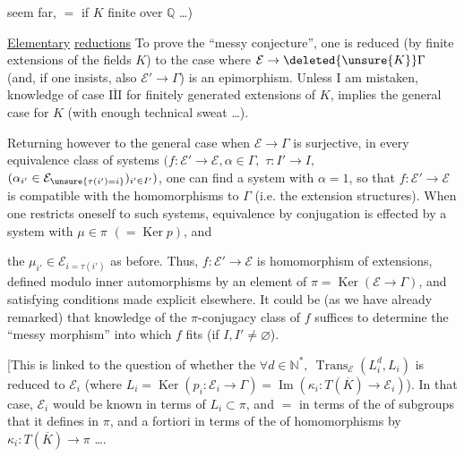 

seem far, $=$ if $K$ finite over $\mathbb Q$ \ldots)

\uline{Elementary} \uline{reductions} To prove the ``messy conjecture'', one is reduced (by finite extensions of the fields $K$) to the case where $\mathcal E\to\deleted{\unsure{K}}\Gamma$ (and, if one insists, also $\mathcal E'\to\Gamma$) is an epimorphism. Unless I am mistaken, knowledge of case \uline{$\overline{\mathrm{III}}$} for finitely generated extensions of $K$, implies the general case for $K$ (with enough technical sweat \ldots).

Returning however to the general case when $\mathcal E\to\Gamma$ is surjective, in every equivalence class of systems $(f:\mathcal E'\to\mathcal E,\alpha\in\Gamma,$  $\tau:I'\to I,$  $(\alpha_{i'}\in\mathcal E_{\unsure{\tau(i')=i}})_{i'\in I'})$, one can find a system with $\alpha=1$, so that $f:\mathcal E'\to\mathcal E$ is compatible with the homomorphisms to $\Gamma$ (i.e. the extension structures).
When one restricts oneself to such systems,  equivalence by conjugation is effected by a system  with \uline{$\mu\in\pi$} $(=\operatorname{Ker}p)$, and



the $\mu_{i'}\in\mathcal E_{i=\tau(i')}$ as before. Thus, $f:\mathcal E'\to\mathcal E$ is   homomorphism of extensions, defined modulo inner automorphisms by an element of $\pi=\operatorname{Ker}(\mathcal E\to\Gamma)$, and satisfying conditions made explicit elsewhere.
It could be (as we have already remarked) that knowledge of the  $\pi$-conjugacy class of $f$ suffices to determine the ``messy morphism'' into which $f$ fits (if $I,I'\ne\varnothing$).

[This is linked to the question of whether the   $\forall d\in\mathbb N^*,\ \operatorname{Trans}_{\mathcal E}(L_i^d,L_i)$ is reduced to $\mathcal E_i$ (where $L_i=\operatorname{Ker}(p_i:\mathcal E_i\to\Gamma)=\operatorname{Im}(\kappa_i:T(\overline K)\to\mathcal E_i)$).
In that case, $\mathcal E_i$ would be known in terms of $L_i\subset\pi$, and $=$ in terms of the  of subgroups that it defines in $\pi$, and a fortiori in terms of the  of homomorphisms  by $\kappa_i:T(\overline K)\to\pi$ \ldots.


